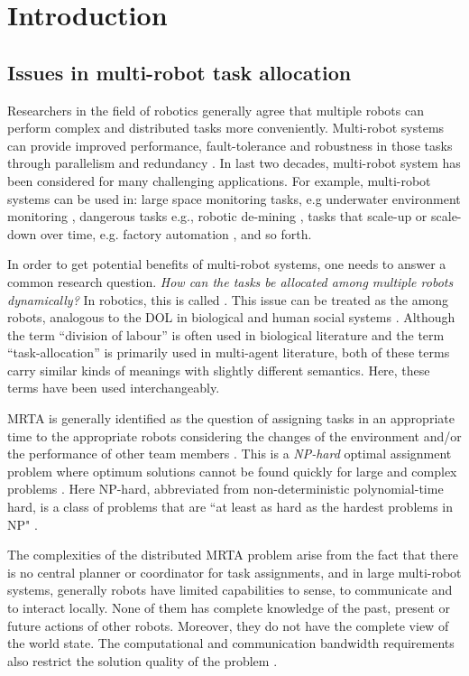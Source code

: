\chapter{Introduction}
\label{intro}
\section{Issues in multi-robot task allocation}
\label{intro:mrta}
Researchers in the field of robotics generally agree that multiple robots can perform complex and distributed tasks more conveniently. Multi-robot systems can provide improved performance, fault-tolerance and robustness in those tasks through parallelism and redundancy \cite{Arkin1998,Parker+2006}. In last two decades, multi-robot system has been considered for many challenging applications. For example, multi-robot systems can be used in: large space monitoring tasks, e.g underwater environment monitoring \cite{Eriksen+2001}, dangerous tasks e.g., robotic de-mining \cite{Dunbar+2002}, tasks that scale-up or scale-down over time, e.g. factory automation \cite{Wurman+2008}, and so forth.

In order to get potential benefits of multi-robot systems,  one needs to answer a common research question. \textit{How can the tasks be allocated among multiple robots dynamically?} In robotics, this is called  \cite{Gerkey+2004}. This issue can be treated as the  among robots, analogous to the DOL in biological and human social systems \cite{Sendova-Franks+1999}. Although the term ``division of labour'' is often used in biological literature and the term ``task-allocation'' is primarily used in multi-agent literature, both of these terms carry similar kinds of meanings with slightly different semantics. Here, these terms have been used interchangeably.

MRTA is generally identified as the question of assigning tasks in an appropriate time to the appropriate robots considering the changes of the environment and/or the performance of other team members \cite{Gerkey+2003}. This is a {\em NP-hard} optimal assignment problem where optimum solutions cannot be found quickly for large and complex problems \cite{Parker2008}. Here NP-hard, abbreviated from non-deterministic polynomial-time hard,  is a class of problems that are ``at least as hard as the hardest problems in NP" \cite{garey1979computers}.

The complexities of the distributed MRTA problem arise from the fact that there is no central planner or coordinator for task assignments, and in large multi-robot systems, generally robots have limited capabilities to sense, to communicate and to interact locally. None of them has complete knowledge of the past, present or future actions of other robots. Moreover, they do not have the complete view of the world state. The computational and communication bandwidth requirements also restrict the solution quality of the problem \cite{Gerkey+2004}.

